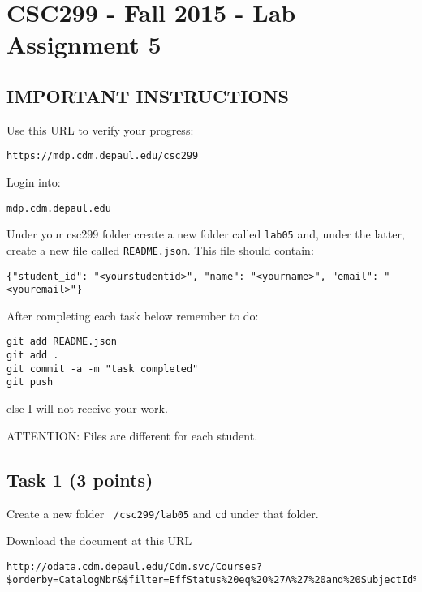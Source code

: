 \documentclass[12pt]{article}
\begin{document}
\section{CSC299 - Fall 2015 - Lab Assignment 5}

\subsection*{IMPORTANT INSTRUCTIONS}

\noindent Use this URL to verify your progress:
\begin{verbatim}
https://mdp.cdm.depaul.edu/csc299
\end{verbatim}

\noindent Login into:
\begin{verbatim}
mdp.cdm.depaul.edu
\end{verbatim}

\noindent Under your csc299 folder create a new folder called {\tt lab05} and, under the latter, create a new file called {\tt README.json}. This file should contain:

\begin{verbatim}
{"student_id": "<yourstudentid>", "name": "<yourname>", "email": "<youremail>"}
\end{verbatim}

\noindent After completing each task below remember to do:

\begin{verbatim}
git add README.json
git add .
git commit -a -m "task completed"
git push
\end{verbatim}

\noindent  else I will not receive your work.

\noindent ATTENTION: Files are different for each student.

\subsection{Task 1 (3 points)}

\noindent  Create a new folder {\tt ~/csc299/lab05} and {\tt cd} under that folder.

\noindent Download the document at this URL

{\tiny
\begin{verbatim}
http://odata.cdm.depaul.edu/Cdm.svc/Courses?$orderby=CatalogNbr&$filter=EffStatus%20eq%20%27A%27%20and%20SubjectId%20eq%27CSC%27
\end{verbatim}}
\end{document}
